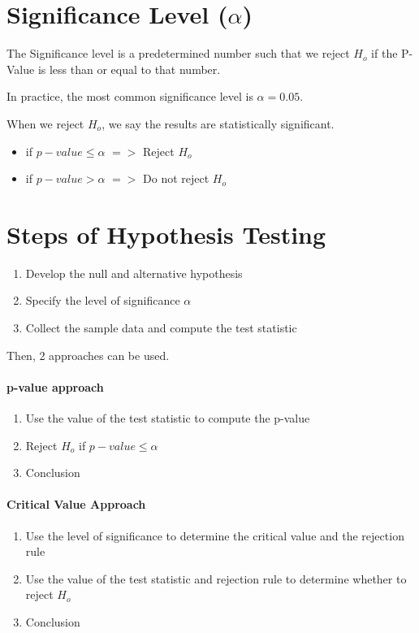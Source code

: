 \documentclass{article}
\begin{document}
    \section*{Significance Level ($\alpha$)}
    The Significance level is a predetermined number such that we reject $H_{o}$ if the P-Value 
    is less than or equal to that number.\par

    In practice, the most common significance level is $\alpha = 0.05$.\par

    When we reject $H_{o}$, we say the results are statistically significant.

    \begin{itemize}
        \item if $p-value \leq \alpha$ $=>$ Reject $H_{o}$
        \item if $p-value > \alpha$ $=>$ Do not reject $H_{o}$
    \end{itemize}

    \section*{Steps of Hypothesis Testing}
        \begin{enumerate}
            \item Develop the null and alternative hypothesis
            \item Specify the level of significance $\alpha$
            \item Collect the sample data and compute the test statistic
        \end{enumerate}

        Then, 2 approaches can be used.
        \paragraph*{p-value approach}
        \begin{enumerate}
            \item Use the value of the test statistic to compute the p-value
            \item Reject $H_{o}$ if $p-value \leq \alpha$
            \item Conclusion
        \end{enumerate}

        \paragraph*{Critical Value Approach}
        \begin{enumerate}
            \item Use the level of significance to determine the 
                    critical value and the rejection rule
            \item Use the value of the test statistic and rejection rule to determine whether to reject $H_{o}$
            \item Conclusion
        \end{enumerate}
\end{document}

